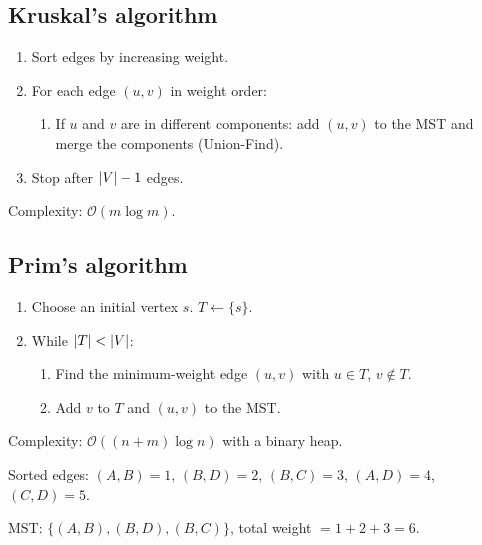 \subsection{Kruskal's algorithm}

\begin{algorithme}[title=\textbf{Kruskal's Algorithm}]
\begin{enumerate}
  \item Sort edges by increasing weight.
  \item For each edge $(u,v)$ in weight order:
    \begin{enumerate}
      \item If $u$ and $v$ are in different components: add $(u,v)$ to the MST
            and merge the components (Union-Find).
    \end{enumerate}
  \item Stop after $\left| V \right| - 1$ edges.
\end{enumerate}
Complexity: $\mathcal{O}(m \log m)$.
\end{algorithme}

\subsection{Prim's algorithm}

\begin{algorithme}[title=\textbf{Prim's Algorithm}]
\begin{enumerate}
  \item Choose an initial vertex $s$. $T \leftarrow \{s\}$.
  \item While $\left| T \right| < \left| V \right|$:
    \begin{enumerate}
      \item Find the minimum-weight edge $(u,v)$ with $u \in T$, $v \notin T$.
      \item Add $v$ to $T$ and $(u,v)$ to the MST.
    \end{enumerate}
\end{enumerate}
Complexity: $\mathcal{O}((n + m) \log n)$ with a binary heap.
\end{algorithme}

\begin{example}
\begin{center}
\end{center}

Sorted edges: $(A,B)=1$, $(B,D)=2$, $(B,C)=3$, $(A,D)=4$, $(C,D)=5$.

MST: $\{(A,B), (B,D), (B,C)\}$, total weight $= 1 + 2 + 3 = 6$.
\end{example}

